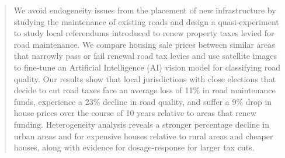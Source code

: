 \documentclass[12pt]{article}
\begin{document}
\begin{titlepage}
\begin{abstract} 
\noindent We avoid endogeneity issues from the placement of new infrastructure by studying the maintenance of existing roads and design a quasi-experiment to study local referendums introduced to renew property taxes levied for road maintenance. We compare housing sale prices between similar areas that narrowly pass or fail renewal road tax levies and use satellite images to fine-tune an Artificial Intelligence (AI) vision model for classifying road quality. Our results show that local jurisdictions with close elections that decide to cut road taxes face an average loss of 11\% in road maintenance funds, experience a 23\% decline in road quality, and suffer a 9\% drop in house prices over the course of 10 years relative to areas that renew funding. Heterogeneity analysis reveals a stronger percentage decline in urban areas and for expensive houses relative to rural areas and cheaper houses, along with evidence for dosage-response for larger tax cuts.

\end{abstract}
\end{titlepage}
\end{document}
